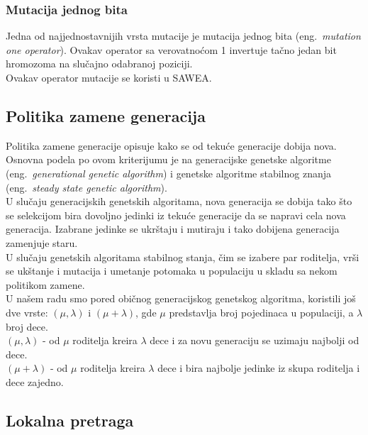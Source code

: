 \documentclass{article}
\begin{document}
\subsubsection{Mutacija jednog bita}
\label{sec:ea_mutacija_one}
Jedna od najjednostavnijih vrsta mutacije je mutacija jednog bita (eng.~{\em mutation one operator}). Ovakav operator sa verovatnoćom 1 invertuje tačno jedan bit hromozoma na slučajno odabranoj poziciji. \\

Ovakav operator mutacije se koristi u SAWEA.


\subsection{Politika zamene generacija}
 \label{sec:ea_zamena}
 Politika zamene generacije \cite{vi_Janicic} opisuje kako se od tekuće generacije dobija nova. Osnovna podela po ovom kriterijumu je na generacijske genetske algoritme (eng.~{\em generational genetic algorithm}) i genetske algoritme stabilnog znanja (eng.~{\em steady state genetic algorithm}). \\
 
 U slučaju generacijskih genetskih algoritama, nova generacija se dobija tako što se selekcijom bira dovoljno jedinki iz tekuće generacije da se napravi cela nova generacija. Izabrane jedinke se ukrštaju i mutiraju i tako dobijena generacija zamenjuje staru. \\
 
 U slučaju genetskih algoritama stabilnog stanja, čim se izabere par roditelja, vrši se ukštanje i mutacija i umetanje potomaka u populaciju u skladu sa nekom politikom zamene. \\
 
 U našem radu smo pored običnog generacijskog genetskog algoritma, koristili još dve vrste: $(\mu, \lambda) $ i $(\mu + \lambda)$, gde $\mu$ predstavlja broj pojedinaca u populaciji, a $\lambda$ broj dece. \\
 
 $(\mu, \lambda)$ - od $\mu$ roditelja kreira $\lambda$ dece i za novu generaciju se uzimaju  najbolji od dece.\\
 
$(\mu + \lambda)$ - od $\mu$ roditelja kreira $\lambda$ dece i bira najbolje jedinke iz skupa roditelja i dece zajedno.

\subsection{Lokalna pretraga}
 \label{sec:ea_lokalna_pretraga}
\end{document}
